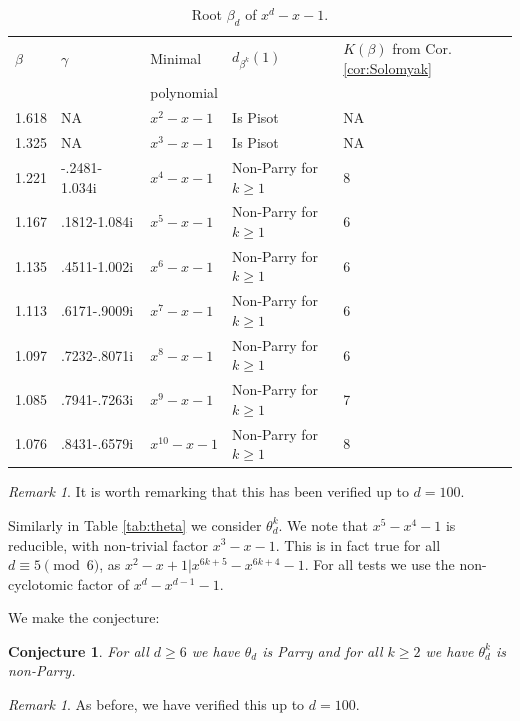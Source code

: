 \documentclass[12pt]{article}
\theoremstyle{plain}
\newtheorem{conj}[theorem]{Conjecture}
\theoremstyle{remark}
\newtheorem{remark}[theorem]{Remark}
\begin{document}
\begin{table}
\begin{center}
\begin{tabular}{|lllp{110pt}l|} \hline
 $\beta$ &$\gamma$&   Minimal  & $d_{\beta^k}(1)$ & $K(\beta)$ from Cor. \ref{cor:Solomyak} \\
 & & polynomial & & \\
 \hline
 1.618 & NA & $x^{2}-x-1$ & Is Pisot & NA \\
1.325 & NA & $x^{3}-x-1$ & Is Pisot & NA \\ 
1.221 & -.2481-1.034i & $x^{4}-x-1$ & Non-Parry for $k \geq 1$ &8\\
1.167 & .1812-1.084i & $x^{5}-x-1$ & Non-Parry for $k \geq 1$ &6\\
1.135 & .4511-1.002i & $x^{6}-x-1$ & Non-Parry for $k \geq 1$ &6\\
1.113 & .6171-.9009i & $x^{7}-x-1$ & Non-Parry for $k \geq 1$ &6\\
1.097 & .7232-.8071i & $x^{8}-x-1$ & Non-Parry for $k \geq 1$ &6\\
1.085 & .7941-.7263i & $x^{9}-x-1$ & Non-Parry for $k \geq 1$ &7\\
1.076 & .8431-.6579i & $x^{10}-x-1$ & Non-Parry for $k \geq 1$ &8\\ \hline
\end{tabular}
\caption{Root $\beta_d$ of $x^d-x-1$.}
\label{tab:beta}
\end{center}
\end{table}


\begin{remark}
 It is worth remarking that this has been verified up to $d = 100$. 
\end{remark}

Similarly in Table \ref{tab:theta} we consider $\theta_d^k$.
We note that $x^5-x^4-1$ is reducible, with non-trivial factor $x^3-x-1$.
This is in fact true for all $d \equiv 5 \pmod 6$, as 
 $x^2-x+1 | x^{6k+5} - x^{6k+4} - 1$.
For all tests we use the non-cyclotomic factor of $x^{d}-x^{d-1}-1$.

We make the conjecture:
\begin{conj}
 \label{conj:3}
 For all $d \geq 6$ we have $\theta_d$ is Parry and for all $k \geq 2$ we have $\theta_d^k$ is non-Parry.
\end{conj}

\begin{remark}
 As before, we have verified this up to $d = 100$.
\end{remark}
\end{document}
